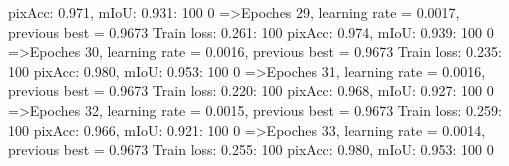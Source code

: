 pixAcc: 0.971, mIoU: 0.931: 100%
  0%
=>Epoches 29, learning rate = 0.0017,                 previous best = 0.9673
Train loss: 0.261: 100%
pixAcc: 0.974, mIoU: 0.939: 100%
  0%
=>Epoches 30, learning rate = 0.0016,                 previous best = 0.9673
Train loss: 0.235: 100%
pixAcc: 0.980, mIoU: 0.953: 100%
  0%
=>Epoches 31, learning rate = 0.0016,                 previous best = 0.9673
Train loss: 0.220: 100%
pixAcc: 0.968, mIoU: 0.927: 100%
  0%
=>Epoches 32, learning rate = 0.0015,                 previous best = 0.9673
Train loss: 0.259: 100%
pixAcc: 0.966, mIoU: 0.921: 100%
  0%
=>Epoches 33, learning rate = 0.0014,                 previous best = 0.9673
Train loss: 0.255: 100%
pixAcc: 0.980, mIoU: 0.953: 100%
  0%
